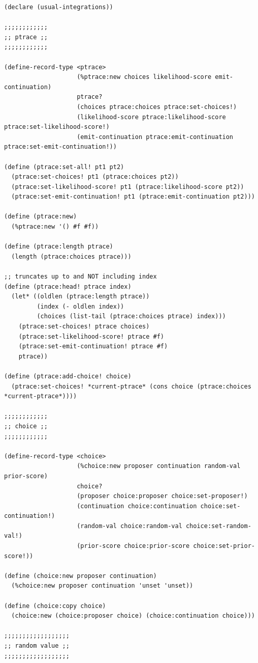 \documentclass{article}
\begin{document}
\begin{verbatim}
(declare (usual-integrations))

;;;;;;;;;;;;
;; ptrace ;;
;;;;;;;;;;;;

(define-record-type <ptrace>
                    (%ptrace:new choices likelihood-score emit-continuation)
                    ptrace?
                    (choices ptrace:choices ptrace:set-choices!)
                    (likelihood-score ptrace:likelihood-score ptrace:set-likelihood-score!)
                    (emit-continuation ptrace:emit-continuation ptrace:set-emit-continuation!))

(define (ptrace:set-all! pt1 pt2)
  (ptrace:set-choices! pt1 (ptrace:choices pt2))
  (ptrace:set-likelihood-score! pt1 (ptrace:likelihood-score pt2))
  (ptrace:set-emit-continuation! pt1 (ptrace:emit-continuation pt2)))

(define (ptrace:new)
  (%ptrace:new '() #f #f))

(define (ptrace:length ptrace)
  (length (ptrace:choices ptrace)))

;; truncates up to and NOT including index
(define (ptrace:head! ptrace index)
  (let* ((oldlen (ptrace:length ptrace))
         (index (- oldlen index))
         (choices (list-tail (ptrace:choices ptrace) index)))
    (ptrace:set-choices! ptrace choices)
    (ptrace:set-likelihood-score! ptrace #f)
    (ptrace:set-emit-continuation! ptrace #f)
    ptrace))

(define (ptrace:add-choice! choice)
  (ptrace:set-choices! *current-ptrace* (cons choice (ptrace:choices *current-ptrace*))))

;;;;;;;;;;;;
;; choice ;;
;;;;;;;;;;;;

(define-record-type <choice>
                    (%choice:new proposer continuation random-val prior-score)
                    choice?
                    (proposer choice:proposer choice:set-proposer!)
                    (continuation choice:continuation choice:set-continuation!)
                    (random-val choice:random-val choice:set-random-val!)
                    (prior-score choice:prior-score choice:set-prior-score!))

(define (choice:new proposer continuation)
  (%choice:new proposer continuation 'unset 'unset))

(define (choice:copy choice)
  (choice:new (choice:proposer choice) (choice:continuation choice)))

;;;;;;;;;;;;;;;;;;
;; random value ;;
;;;;;;;;;;;;;;;;;;


\end{verbatim}
\end{document}
